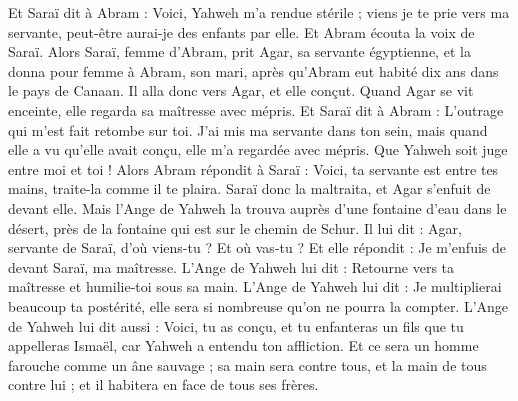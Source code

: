 \begin{multicols}{2}
Et Saraï dit à Abram : Voici, Yahweh m'a rendue stérile ; viens je te prie vers ma servante, peut-être aurai-je des enfants par elle. Et Abram écouta la voix de Saraï.
Alors Saraï, femme d'Abram, prit Agar, sa servante égyptienne, et la donna pour femme à Abram, son mari, après qu’Abram eut habité dix ans dans le pays de Canaan.
Il alla donc vers Agar, et elle conçut. Quand Agar se vit enceinte, elle regarda sa maîtresse avec mépris.
Et Saraï dit à Abram : L'outrage qui m'est fait retombe sur toi. J’ai mis ma servante dans ton sein, mais quand elle a vu qu'elle avait conçu, elle m'a regardée avec mépris. Que Yahweh soit juge entre moi et toi !
Alors Abram répondit à Saraï : Voici, ta servante est entre tes mains, traite-la comme il te plaira. Saraï donc la maltraita, et Agar s'enfuit de devant elle.
Mais l'Ange de Yahweh la trouva auprès d'une fontaine d'eau dans le désert, près de la fontaine qui est sur le chemin de Schur.
Il lui dit : Agar, servante de Saraï, d'où viens-tu ? Et où vas-tu ? Et elle répondit : Je m'enfuis de devant Saraï, ma maîtresse.
L'Ange de Yahweh lui dit : Retourne vers ta maîtresse et humilie-toi sous sa main.
L'Ange de Yahweh lui dit : Je multiplierai beaucoup ta postérité, elle sera si nombreuse qu'on ne pourra la compter.
L'Ange de Yahweh lui dit aussi : Voici, tu as conçu, et tu enfanteras un fils que tu appelleras Ismaël, car Yahweh a entendu ton affliction.
Et ce sera un homme farouche comme un âne sauvage ; sa main sera contre tous, et la main de tous contre lui ; et il habitera en face de tous ses frères.

\end{multicols}
